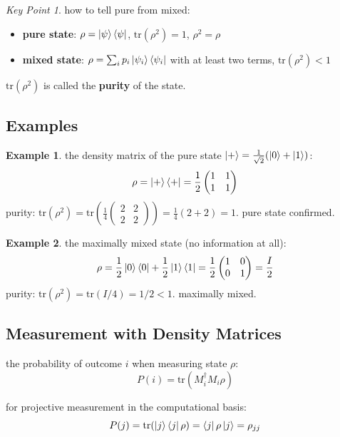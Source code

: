 \documentclass[11pt,a4paper]{article}
\theoremstyle{definition}
\newtheorem{example}{Example}[section]
\theoremstyle{remark}
\newtheorem*{keypoint}{Key Point}
\begin{document}
\begin{keypoint}
how to tell pure from mixed:
\begin{itemize}
    \item \textbf{pure state}: $\rho = \ket{\psi}\bra{\psi}$, $\text{tr}(\rho^2) = 1$, $\rho^2 = \rho$
    \item \textbf{mixed state}: $\rho = \sum_i p_i \ket{\psi_i}\bra{\psi_i}$ with at least two terms, $\text{tr}(\rho^2) < 1$
\end{itemize}
$\text{tr}(\rho^2)$ is called the \textbf{purity} of the state.
\end{keypoint}

\subsection{Examples}

\begin{example}
the density matrix of the pure state $\ket{+} = \frac{1}{\sqrt{2}}(\ket{0} + \ket{1})$:
\[
\rho = \ket{+}\bra{+} = \frac{1}{2}\begin{pmatrix} 1 & 1 \\ 1 & 1 \end{pmatrix}
\]
purity: $\text{tr}(\rho^2) = \text{tr}\left(\frac{1}{4}\begin{pmatrix} 2 & 2 \\ 2 & 2 \end{pmatrix}\right) = \frac{1}{4}(2+2) = 1$. pure state confirmed.
\end{example}

\begin{example}
the maximally mixed state (no information at all):
\[
\rho = \frac{1}{2}\ket{0}\bra{0} + \frac{1}{2}\ket{1}\bra{1} = \frac{1}{2}\begin{pmatrix} 1 & 0 \\ 0 & 1 \end{pmatrix} = \frac{I}{2}
\]
purity: $\text{tr}(\rho^2) = \text{tr}(I/4) = 1/2 < 1$. maximally mixed.
\end{example}

\subsection{Measurement with Density Matrices}

the probability of outcome $i$ when measuring state $\rho$:
\[
P(i) = \text{tr}(M_i^\dagger M_i \rho)
\]

for projective measurement in the computational basis:
\[
P(j) = \text{tr}(\ket{j}\bra{j}\rho) = \bra{j}\rho\ket{j} = \rho_{jj}
\]
\end{document}

